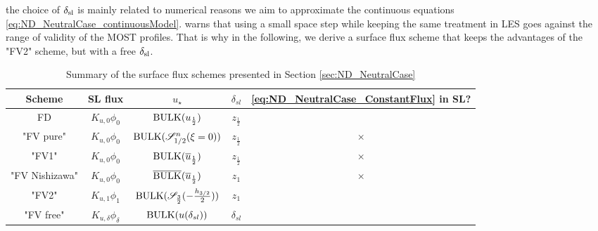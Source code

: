 the choice of $\delta_{\rm sl}$ is mainly related to numerical
reasons we aim to approximate the continuous equations
\eqref{eq:ND_NeutralCase_continuousModel}.
\cite{basu_cautionary_2017} warns that using a small space step
while keeping the same treatment in LES goes against the
range of validity of the MOST profiles.
That is why in the following,
we derive a surface flux scheme that keeps
the advantages of the "FV2" scheme, but with a free $\delta_{\rm sl}$.
%
\begin{table}
	\centering
\begin{tabular}{c|c|c|c|c}
	Scheme & SL flux & $u_\star$ & $\delta_{sl}$ 
		& \eqref{eq:ND_NeutralCase_ConstantFlux} in SL? \\
		\hline
		FD & $K_{u,0} \phi_0$ & ${\rm BULK}(u_{\frac{1}{2}})$
			& $z_{\frac{1}{2}}$ & \checkmark \\
		"FV pure" & $K_{u,0} \phi_0$ &
			${\rm BULK}({\cal S}_{1/2}^{n}(\xi=0))$
			& $z_{\frac{1}{2}}$ & $\times$ \\
		"FV1" & $K_{u,0} \phi_0$ &
			${\rm BULK}(\overline{u}_{\frac{1}{2}})$
			& $z_{\frac{1}{2}}$ & $\times$ \\
		"FV Nishizawa" & $K_{u,0} \phi_0$ &
			$\overline{\rm BULK}
				(\overline{u}_{\frac{1}{2}})$
			& $z_1$ & $\times$ \\
		"FV2" & $K_{u,1} \phi_1$ &
			${\rm BULK} ({\cal S}_{\frac{3}{2}}(
				  -\frac{h_{3/2}}{2}))$
			& $z_1$ & \checkmark \\
		"FV free" & $K_{u,\delta} \phi_{\delta}$ &
			${\rm BULK}
				(u(\delta_{sl}))$
			& $\delta_{sl}$ & \checkmark \\
	\end{tabular}
	\caption{Summary of the surface flux schemes presented in
	Section \ref{sec:ND_NeutralCase}}
	\label{tab:ND_NeutralCase_summary_sfscheme}
\end{table}
